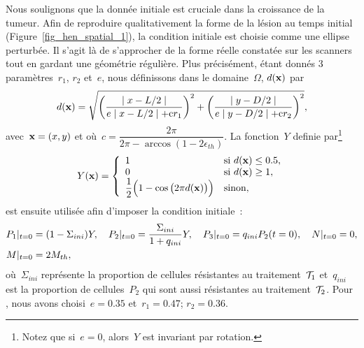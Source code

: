 \documentclass[main.tex]{subfiles}
\begin{document}
Nous soulignons que la donnée initiale est cruciale dans la croissance de la tumeur. Afin de reproduire qualitativement la forme de la lésion au temps initial (\cf Figure~\ref{fig_hen_spatial_1}), 
la condition initiale est choisie comme une ellipse perturbée. 
Il s'agit là de s'approcher de la forme réelle constatée sur les scanners tout en gardant une géométrie régulière. 
Plus précisément, étant donnés 3 paramètres~$r_1$, $r_2$ et~$e$, nous définissons dans le domaine~$\Omega$, $d(\mathbf{x})$ par
\begin{equation}\label{cond-ini}
d(\mathbf{x})=\sqrt{\left(\dfrac{\mid x - L/2 \mid }{e\mid x - L/2 \mid +
      {\rm c} r_1}\right)^2+\left(\dfrac{\mid y - D/2 \mid }{e\mid y -
      D/2 \mid + {\rm c} r_2}\right)^2 },
\end{equation}
avec~$\mathbf{x}=(x,y)$ et où~$c=\dfrac{2\pi}{2\pi-\arccos(1-2\epsilon_{th})}$. 
La fonction~$Y$ definie par\footnote{Notez que si~$e=0$, alors~$Y$ est  invariant par rotation.}
\begin{equation}Y(\mathbf{x})=\left\{
\begin{array}{ll}
1 & \textrm{si}\ d(\mathbf{x})\leq 0.5,\\
0 & \textrm{si}\ d(\mathbf{x})\geq 1, \\
\dfrac{1}{2}\Big(1-\cos \big(2\pi d(\mathbf{x})\big)\Big)& \textrm{sinon},
\label{eq:CI_forme}
\end{array}\right.
\end{equation}
est ensuite utilisée afin d'imposer la condition initiale~:
\begin{equation}
\label{eq:CI}
\begin{aligned}
P_1|_{t=0}&=(1-\Sigma_{ini})Y, \quad
P_2|_{t=0}=\dfrac{\Sigma_{ini}}{1+q_{ini}}Y, \quad
P_3|_{t=0}=q_{ini}P_2(t=0), \quad N|_{t=0}=0, \\
M|_{t=0}&=2M_{th},
\end{aligned}
\end{equation}
où~$\Sigma_{ini}$ représente la proportion de cellules résistantes au traitement~${\mathcal T_1}$ et~$q_{ini}$ est la proportion de cellules~$P_2$
qui sont aussi résistantes au traitement~${\mathcal T_2}$. Pour \Nber, nous avons choisi~$e=0.35$ et~$r_1=0.47$; $r_2=0.36$.
\end{document}
